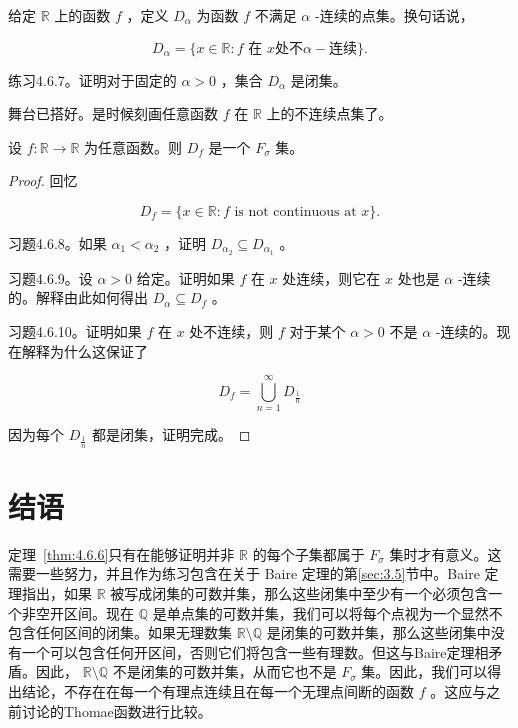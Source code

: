 给定 \(\mathbb{R}\) 上的函数 \(f\) ，定义 \({D}_{\alpha }\) 为函数 \(f\) 不满足 \(\alpha\) -连续的点集。换句话说，

\[
{D}_{\alpha } = \{ x \in  \mathbb{R} : f \text{ 在 }x  \text{处不} \alpha-  \text{连续} \} .
\]

练习4.6.7。证明对于固定的 \(\alpha  > 0\) ，集合 \({D}_{\alpha }\) 是闭集。

舞台已搭好。是时候刻画任意函数 \(f\) 在 \(\mathbb{R}\) 上的不连续点集了。

\begin{Thm}
  \label{thm:4.6.6}
  设 \(f : \mathbb{R} \rightarrow  \mathbb{R}\) 为任意函数。则 \({D}_{f}\) 是一个 \({F}_{\sigma }\) 集。
\end{Thm}

\begin{proof}
  回忆

\[
{D}_{f} = \{ x \in  \mathbb{R} : f\text{ is not continuous at }x\} .
\]

习题4.6.8。如果 \({\alpha }_{1} < {\alpha }_{2}\) ，证明 \({D}_{{\alpha }_{2}} \subseteq  {D}_{{\alpha }_{1}}\) 。

习题4.6.9。设 \(\alpha  > 0\) 给定。证明如果 \(f\) 在 \(x\) 处连续，则它在 \(x\) 处也是 \(\alpha\) -连续的。解释由此如何得出 \({D}_{\alpha } \subseteq  {D}_{f}\) 。

习题4.6.10。证明如果 \(f\) 在 \(x\) 处不连续，则 \(f\) 对于某个 \(\alpha  > 0\) 不是 \(\alpha\) -连续的。现在解释为什么这保证了

\[
{D}_{f} = \mathop{\bigcup }\limits_{{n = 1}}^{\infty }{D}_{\frac{1}{n}}
\]

因为每个 \({D}_{\frac{1}{n}}\) 都是闭集，证明完成。
\end{proof}



\section{结语}
\label{sec:4.7}
定理~\ref{thm:4.6.6}只有在能够证明并非 \(\mathbb{R}\) 的每个子集都属于 \({F}_{\sigma }\) 集时才有意义。这需要一些努力，并且作为练习包含在关于 Baire 定理的第\ref{sec:3.5}节中。Baire 定理指出，如果 \(\mathbb{R}\) 被写成闭集的可数并集，那么这些闭集中至少有一个必须包含一个非空开区间。现在 \(\mathbb{Q}\) 是单点集的可数并集，我们可以将每个点视为一个显然不包含任何区间的闭集。如果无理数集 \(\mathbb{R}\setminus\mathbb{Q}\) 是闭集的可数并集，那么这些闭集中没有一个可以包含任何开区间，否则它们将包含一些有理数。但这与Baire定理相矛盾。因此， \(\mathbb{R}\setminus\mathbb{Q}\) 不是闭集的可数并集，从而它也不是 \({F}_{\sigma }\) 集。因此，我们可以得出结论，不存在在每一个有理点连续且在每一个无理点间断的函数 \(f\) 。这应与之前讨论的Thomae函数进行比较。

